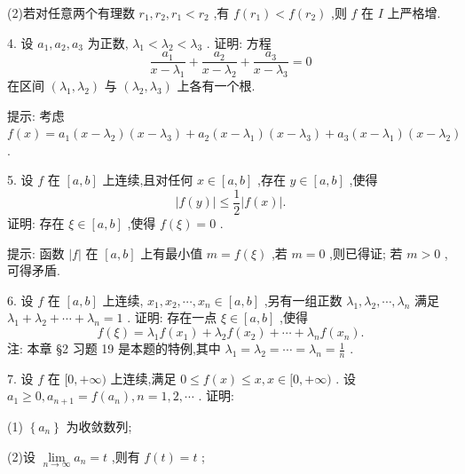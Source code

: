 (2)若对任意两个有理数 \({r}_{1},{r}_{2},{r}_{1} < {r}_{2}\) ,有 \(f\left( {r}_{1}\right)  < f\left( {r}_{2}\right)\) ,则 \(f\) 在 \(I\) 上严格增.

4. 设 \({a}_{1},{a}_{2},{a}_{3}\) 为正数, \({\lambda }_{1} < {\lambda }_{2} < {\lambda }_{3}\) . 证明: 方程
\[
\frac{{a}_{1}}{x - {\lambda }_{1}} + \frac{{a}_{2}}{x - {\lambda }_{2}} + \frac{{a}_{3}}{x - {\lambda }_{3}} = 0
\]
在区间 \(\left( {{\lambda }_{1},{\lambda }_{2}}\right)\) 与 \(\left( {{\lambda }_{2},{\lambda }_{3}}\right)\) 上各有一个根.

提示: 考虑 \(f\left( x\right)  = {a}_{1}\left( {x - {\lambda }_{2}}\right) \left( {x - {\lambda }_{3}}\right)  + {a}_{2}\left( {x - {\lambda }_{1}}\right) \left( {x - {\lambda }_{3}}\right)  + {a}_{3}\left( {x - {\lambda }_{1}}\right) \left( {x - {\lambda }_{2}}\right)\) .

5. 设 \(f\) 在 \(\left\lbrack  {a,b}\right\rbrack\) 上连续,且对任何 \(x \in  \left\lbrack  {a,b}\right\rbrack\) ,存在 \(y \in  \left\lbrack  {a,b}\right\rbrack\) ,使得
\[
\left| {f\left( y\right) }\right|  \leq  \frac{1}{2}\left| {f\left( x\right) }\right| .
\]
证明: 存在 \(\xi  \in  \left\lbrack  {a,b}\right\rbrack\) ,使得 \(f\left( \xi \right)  = 0\) .

提示: 函数 \(\left| f\right|\) 在 \(\left\lbrack  {a,b}\right\rbrack\) 上有最小值 \(m = f\left( \xi \right)\) ,若 \(m = 0\) ,则已得证; 若 \(m > 0\) ,可得矛盾.

6. 设 \(f\) 在 \(\left\lbrack  {a,b}\right\rbrack\) 上连续, \({x}_{1},{x}_{2},\cdots ,{x}_{n} \in  \left\lbrack  {a,b}\right\rbrack\) ,另有一组正数 \({\lambda }_{1},{\lambda }_{2},\cdots ,{\lambda }_{n}\) 满足 \({\lambda }_{1} + {\lambda }_{2} + \cdots  + {\lambda }_{n} = 1\) . 证明: 存在一点 \(\xi  \in  \left\lbrack  {a,b}\right\rbrack\) ,使得
\[
f\left( \xi \right)  = {\lambda }_{1}f\left( {x}_{1}\right)  + {\lambda }_{2}f\left( {x}_{2}\right)  + \cdots  + {\lambda }_{n}f\left( {x}_{n}\right) .
\]
注: 本章 §2 习题 19 是本题的特例,其中 \({\lambda }_{1} = {\lambda }_{2} = \cdots  = {\lambda }_{n} = \frac{1}{n}\) .

7. 设 \(f\) 在 \(\lbrack 0, + \infty )\) 上连续,满足 \(0 \leq  f\left( x\right)  \leq  x,x \in  \lbrack 0, + \infty )\) . 设 \({a}_{1} \geq  0,{a}_{n + 1} = f\left( {a}_{n}\right) ,n = 1,2,\cdots\) . 证明:

(1) \(\left\{  {a}_{n}\right\}\) 为收敛数列;

(2)设 \(\mathop{\lim }\limits_{{n \rightarrow  \infty }}{a}_{n} = t\) ,则有 \(f\left( t\right)  = t\) ;

